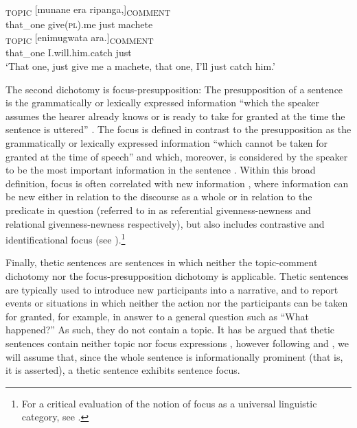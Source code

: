 \documentclass[output=paper]{langsci/langscibook}
\begin{document}
\ea\label{ex:1.nicolle}
\\
\gll [Oyo]\textsubscript{TOPIC} [munane era ripanga,]\textsubscript{COMMENT}\\
    {\db}that\_one {\db}give(\textsc{pl}).me just machete\\


\gll [oyo]\textsubscript{TOPIC} [enimugwata ara.]\textsubscript{COMMENT}\\
    {\db}that\_one {\db}I.will.him.catch just\\
\glt ‘That one, just give me a machete, that one, I’ll just catch him.’
\z

The second dichotomy is focus-presupposition: The presupposition of a sentence is the grammatically or lexically expressed information “which the speaker assumes the hearer already knows or is ready to take for granted at the time the sentence is uttered” \citep[52]{lambrecht1994}. The focus is defined in contrast to the presupposition as the grammatically or lexically expressed information “which cannot be taken for granted at the time of speech” \citep[207]{lambrecht1994} and which, moreover, is considered by the speaker to be the most important information in the sentence \citep[277]{dik1989}. Within this broad definition, focus is often correlated with new information \citep[39]{good2010}, where information can be new either in relation to the discourse as a whole or in relation to the predicate in question (referred to in \citealt{gundelfretheim2004} as referential givenness-newness and relational givenness-newness respectively), but also includes contrastive and identificational focus (see \citealt{gibsonetaltoappear}).\footnote{For a critical evaluation of the notion of focus as a universal linguistic category, see \citet{maticwedgwood2013}.}

Finally, thetic sentences are sentences in which neither the topic-comment dichotomy nor the focus-presupposition dichotomy is applicable. Thetic sentences are typically used to introduce new participants into a narrative, and to report events or situations in which neither the action nor the participants can be taken for granted, for example, in answer to a general question such as “What happened?” As such, they do not contain a topic. It has be argued that thetic sentences contain neither topic nor focus expressions \citep[755]{yoneda2011}, however following \citet{lambrecht1994,lambrecht2000} and \citet[55]{nicolle2015b}, we will assume that, since the whole sentence is informationally prominent (that is, it is asserted), a thetic sentence exhibits sentence focus.
\end{document}
